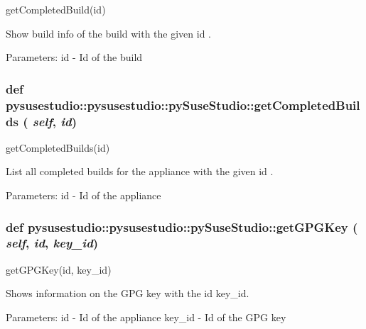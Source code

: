 \label{classpysusestudio_1_1pysusestudio_1_1py_suse_studio_ac7f5a0a2bc51fa52ff1cd62d37c11262}
\begin{DoxyVerb}getCompletedBuild(id)

       Show build info of the build with the given id .
        
            Parameters:
id - Id of the build

\end{DoxyVerb}
 \hypertarget{classpysusestudio_1_1pysusestudio_1_1py_suse_studio_a6271c49fe63e2b45475fb0079e1618d5}{
\subsubsection[{getCompletedBuilds}]{\setlength{\rightskip}{0pt plus 5cm}def pysusestudio::pysusestudio::pySuseStudio::getCompletedBuilds ( {\em self}, \/   {\em id})}}
\label{classpysusestudio_1_1pysusestudio_1_1py_suse_studio_a6271c49fe63e2b45475fb0079e1618d5}
\begin{DoxyVerb}getCompletedBuilds(id)

        List all completed builds for the appliance with the given id .
        
            Parameters:
id - Id of the appliance

\end{DoxyVerb}
 \hypertarget{classpysusestudio_1_1pysusestudio_1_1py_suse_studio_a3e2f0938aa58d901f683ed980a22c8df}{
\subsubsection[{getGPGKey}]{\setlength{\rightskip}{0pt plus 5cm}def pysusestudio::pysusestudio::pySuseStudio::getGPGKey ( {\em self}, \/   {\em id}, \/   {\em key\_\-id})}}
\label{classpysusestudio_1_1pysusestudio_1_1py_suse_studio_a3e2f0938aa58d901f683ed980a22c8df}
\begin{DoxyVerb}getGPGKey(id, key_id)

        Shows information on the GPG key with the id key_id.  
            
            Parameters:
id - Id of the appliance
key_id - Id of the GPG key

\end{DoxyVerb}
